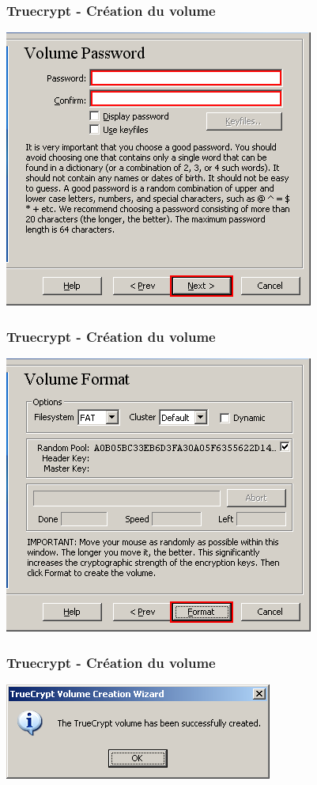 \documentclass{beamer}
\begin{document}
\begin{frame}
\frametitle{Truecrypt - Création du volume}
\begin{center}
\includegraphics[scale=0.5] {./images/Truecrypt09.png} 
\end{center}
\end{frame}
\begin{frame}
\frametitle{Truecrypt - Création du volume}
\begin{center}
\includegraphics[scale=4] {./images/Truecrypt10.png} 
\end{center}
\end{frame}
\begin{frame}
\frametitle{Truecrypt - Création du volume}
\begin{center}
\includegraphics[scale=0.5] {./images/Truecrypt11.png} 
\end{center}
\end{frame}
\end{document}
